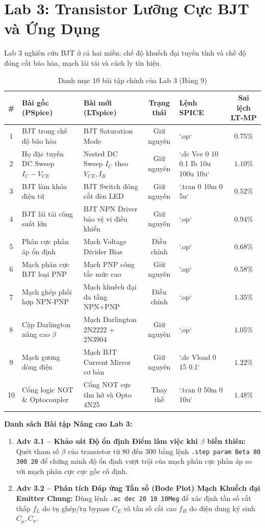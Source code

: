 \documentclass[12pt,a4paper]{report}
\begin{document}
\section{Lab 3: Transistor Lưỡng Cực BJT và Ứng Dụng}
Lab 3 nghiên cứu BJT ở cả hai miền: chế độ khuếch đại tuyến tính và chế độ đóng cắt bão hòa, mạch lái tải và cách ly tín hiệu.

\begin{table}[H]
\centering
\caption{Danh mục 10 bài tập chính của Lab 3 (Bảng 9)}
\label{tab:lab3_details}
\renewcommand{\arraystretch}{1.2}
\small
\begin{tabularx}{\textwidth}{|c|p{4.2cm}|p{4.0cm}|c|l|c|}
\hline
\rowcolor{codebg}
\textbf{\#} & \textbf{Bài gốc (PSpice)} & \textbf{Bài mới (LTspice)} & \textbf{Trạng thái} & \textbf{Lệnh SPICE} & \textbf{Sai lệch LT-MP} \\ \hline
1 & BJT trong chế độ bão hòa & BJT Saturation Mode & Giữ nguyên & `.op` & $0.75\%$ \\ \hline
2 & Họ đặc tuyến DC Sweep $I_C-V_{CE}$ & Nested DC Sweep $I_C$ theo $V_{CE}, I_B$ & Giữ nguyên & `.dc Vce 0 10 0.1 Ib 10u 100u 10u` & $1.10\%$ \\ \hline
3 & BJT làm khóa điện tử & BJT Switch đóng cắt đèn LED & Giữ nguyên & `.tran 0 10m 0 5u` & $0.52\%$ \\ \hline
4 & BJT lái tải công suất lớn & BJT NPN Driver bảo vệ vi điều khiển & Giữ nguyên & `.op` & $0.94\%$ \\ \hline
5 & Phân cực phân áp ổn định & Mạch Voltage Divider Bias & Điều chỉnh & `.op` & $0.68\%$ \\ \hline
6 & Mạch phân cực BJT loại PNP & Mạch PNP công tắc mức cao & Giữ nguyên & `.op` & $0.58\%$ \\ \hline
7 & Mạch ghép phối hợp NPN-PNP & Mạch khuếch đại đa tầng NPN+PNP & Điều chỉnh & `.op` & $1.35\%$ \\ \hline
8 & Cặp Darlington nâng cao $\beta$ & Mạch Darlington 2N2222 + 2N3904 & Giữ nguyên & `.op` & $1.05\%$ \\ \hline
9 & Mạch gương dòng điện & Mạch BJT Current Mirror cơ bản & Giữ nguyên & `.dc Vload 0 15 0.1` & $1.22\%$ \\ \hline
10 & Cổng logic NOT \& Optocoupler & Cổng NOT cực thu hở và Opto 4N25 & Thay thế & `.tran 0 50m 0 10u` & $1.48\%$ \\ \hline
\end{tabularx}
\end{table}

\textbf{Danh sách Bài tập Nâng cao Lab 3:}
\begin{enumerate}
    \item \textbf{Adv 3.1 -- Khảo sát Độ ổn định Điểm làm việc khi $\beta$ biến thiên:} Quét tham số $\beta$ của transistor từ 80 đến 300 bằng lệnh \lstinline|.step param Beta 80 300 20| để chứng minh độ ổn định vượt trội của mạch phân cực phân áp so với mạch phân cực cực gốc cố định.
    \item \textbf{Adv 3.2 -- Phân tích Đáp ứng Tần số (Bode Plot) Mạch Khuếch đại Emitter Chung:} Dùng lệnh \lstinline|.ac dec 20 10 10Meg| để xác định tần số cắt thấp $f_L$ do tụ ghép/tụ bypass $C_E$ và tần số cắt cao $f_H$ do điện dung ký sinh $C_{\mu}, C_{\pi}$.
\end{enumerate}
\end{document}
